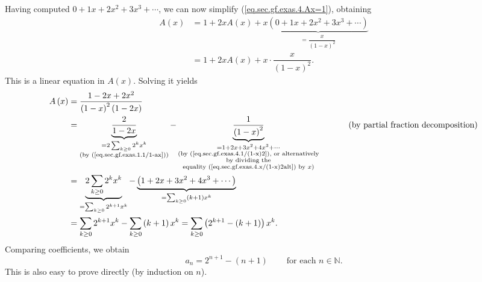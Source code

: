 Having computed $0+1x+2x^{2}+3x^{3}+\cdots$, we can now simplify
(\ref{eq.sec.gf.exas.4.Ax=1}), obtaining%
\begin{align*}
A\left(  x\right)   &  =1+2xA\left(  x\right)  +x\underbrace{\left(
0+1x+2x^{2}+3x^{3}+\cdots\right)  }_{=\dfrac{x}{\left(  1-x\right)  ^{2}}}\\
&  =1+2xA\left(  x\right)  +x\cdot\dfrac{x}{\left(  1-x\right)  ^{2}}.
\end{align*}
This is a linear equation in $A\left(  x\right)  $. Solving it yields%
\begin{align*}
A\left(  x\right)   &  =\dfrac{1-2x+2x^{2}}{\left(  1-x\right)  ^{2}\left(
1-2x\right)  }\\
&  =\underbrace{\dfrac{2}{1-2x}}_{\substack{=2\sum_{k\geq0}2^{k}%
x^{k}\\\text{(by (\ref{eq.sec.gf.exas.1.1/1-ax}))}}}-\underbrace{\dfrac
{1}{\left(  1-x\right)  ^{2}}}_{\substack{=1+2x+3x^{2}+4x^{3}+\cdots
\\\text{(by (\ref{eq.sec.gf.exas.4.1/(1-x)2}), or alternatively}\\\text{by
dividing the}\\\text{equality (\ref{eq.sec.gf.exas.4.x/(1-x)2alt}) by
}x\text{)}}}\ \ \ \ \ \ \ \ \ \ \left(  \text{by partial fraction
decomposition}\right) \\
&  =\underbrace{2\sum_{k\geq0}2^{k}x^{k}}_{=\sum_{k\geq0}2^{k+1}x^{k}%
}-\underbrace{\left(  1+2x+3x^{2}+4x^{3}+\cdots\right)  }_{=\sum_{k\geq
0}\left(  k+1\right)  x^{k}}\\
&  =\sum_{k\geq0}2^{k+1}x^{k}-\sum_{k\geq0}\left(  k+1\right)  x^{k}%
=\sum_{k\geq0}\left(  2^{k+1}-\left(  k+1\right)  \right)  x^{k}.
\end{align*}
Comparing coefficients, we obtain%
\[
a_{n}=2^{n+1}-\left(  n+1\right)  \ \ \ \ \ \ \ \ \ \ \text{for each }%
n\in\mathbb{N}.
\]
This is also easy to prove directly (by induction on $n$).
